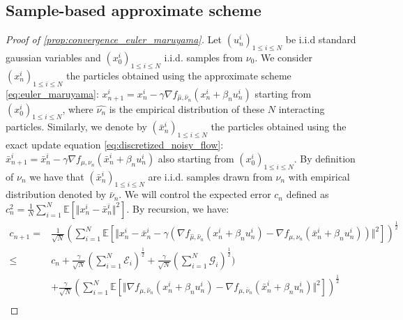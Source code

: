 




\subsection{Sample-based approximate scheme}
\begin{proof}[Proof of \cref{prop:convergence_euler_maruyama}]\label{proof:propagation_chaos}
Let $(u_{n}^{i})_{1\leq i\leq N}$ be i.i.d standard gaussian variables and $(x_{0}^{i})_{1\leq i\leq N}$ i.i.d. samples from $\nu_0$. We consider $(x_n^i)_{1\leq i\leq N}$ the particles obtained using the approximate scheme \cref{eq:euler_maruyama}: $x_{n+1}^{i}=x_{n}^{i}-\gamma\nabla f_{\hat{\mu},\hat{\nu}_{n}}(x_{n}^{i}+\beta_{n}u_{n}^{i})$ starting from $(x_{0}^{i})_{1\leq i\leq N}$, where $\hat{\nu_n}$ is the empirical distribution of these $N$ interacting particles. Similarly, we denote by $(\bar{x}_{n}^{i})_{1\leq i\leq N}$ the particles obtained using the exact update equation \cref{eq:discretized_noisy_flow}: $\bar{x}_{n+1}^{i}=\bar{x}_{n}^{i}-\gamma\nabla f_{\mu,\nu_{n}}(\bar{x}_{n}^{i}+\beta_{n}u_{n}^{i})$ also starting from $(x_{0}^{i})_{1\leq i\leq N}$.
By definition of $\nu_n$ we have that  $(\bar{x}_{n}^{i})_{1\leq i\leq N}$ are i.i.d. samples drawn from $\nu_n$ with empirical distribution denoted by $\bar{\nu}_{n}$.
We will control the expected error $c_{n}$ defined as  $c^2_{n}= \frac{1}{N}\sum_{i=1}^N \mathbb{E}\left[\Vert x_{n}^{i}-\bar{x}_{n}^{i}\Vert^{2}\right]$. By recursion, we have:
\begin{align*}
c_{n+1} = & \frac{1}{\sqrt{N}}\left(\sum_{i=1}^{N}\mathbb{E}\left[\Vert x_{n}^{i}-\bar{x}_{n}^{i}-\gamma(\nabla f_{\hat{\mu},\hat{\nu}_{n}}(x_{n}^{i}+\beta_{n}u_{n}^{i})-\nabla f_{\mu,\nu_{n}}(\bar{x}_{n}^{i}+\beta_{n}u_{n}^{i}))\Vert^{2}\right]\right)^{\frac{1}{2}}\label{eq:main_inequality_c_n_1}\\
\leq &  c_{n} +\frac{\gamma}{\sqrt{N}}(\sum_{i=1}^{N}\mathcal{E}_{i})^{\frac{1}{2}}+\frac{\gamma}{\sqrt{N}}(\sum_{i=1}^{N}\mathcal{G}_{i})^{\frac{1}{2}})  \\
& +\frac{\gamma}{\sqrt{N}}(\sum_{i=1}^{N}\mathbb{E}[\Vert\nabla f_{\mu,\hat{\nu}_{n}}(x_{n}^{i}+\beta_{n}u_{n}^{i})-\nabla f_{\mu,\bar{\nu}_{n}}(\bar{x}_{n}^{i}+\beta_{n}u_{n}^{i})\Vert^{2}])^{\frac{1}{2}}\\

\end{align*}
\end{proof}

